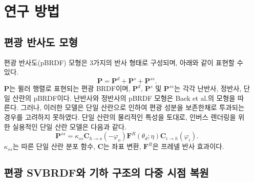 \documentclass[a4paper,twocolumn]{article}
\begin{document}
\section{연구 방법}
\label{sec:methods}


\subsection{편광 반사도 모형}
\label{subsec:model}
편광 반사도(pBRDF) 모형은 3가지의 반사 형태로 구성되며, 아래와 같이 표현할 수 있다.
\begin{equation}
	\label{eq:diffuse_and_specular}
	\mathbf{P}={{\mathbf{P}}^{d}}+{{\mathbf{P}}^{s}}+{{\mathbf{P}}^{ss}}.
\end{equation}
${\mathbf{P}}$는 뮐러 행렬로 표현되는 편광 BRDF이며,  ${\mathbf{P}}^{d}$, ${\mathbf{P}}^{s}$ 및 ${\mathbf{P}}^{ss}$는 각각 난반사, 정반사, 단일 산란의 pBRDF이다.
난반사와 정반사의 pBRDF 모형은 Baek et al.\cite{Baek2018}의 모형을 따른다.
그러나, 이러한 모델은 단일 산란으로 인하여 편광 성분을 보존한채로 투과되는 경우를 고려하지 못하였다. 
단일 산란의 물리적인 특성을 토대로, 인버스 렌더링을 위한 실용적인 단일 산란 모델은 다음과 같다. 
\begin{equation}
	\label{eq:single_scattering_transport}
	{{\mathbf{P}}^{ss}}= {{\kappa}_{ss}} {{\mathbf{C}}_{h\to o}}\left(-{\varphi_{o}} \right){{\mathbf{F}}^{R}}\left( {{\theta }_{d}};\eta  \right){{\mathbf{C}}_{i\to h}}\left({\varphi_{i}} \right).
\end{equation}
%
$\kappa_{ss}$는 따른 단일 산란 분포 함수, $\mathbf{C}$는 좌표 변환, $\mathbf{F}^{R}$은 프레넬 반사 효과이다.


\subsection{편광 SVBRDF와 기하 구조의 다중 시점 복원}
\label{subsec:reconstruction}
\end{document}
